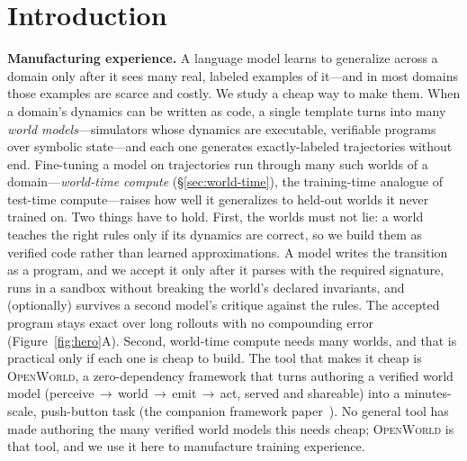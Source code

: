 \documentclass[11pt]{article}
\newcommand{\openworld}{\textsc{OpenWorld}}
\begin{document}
\section{Introduction}
\textbf{Manufacturing experience.} A language model learns to generalize across a domain only after
it sees many real, labeled examples of it---and in most domains those examples are scarce and
costly. We study a cheap way to make them. When a domain's dynamics can be written as
code, a single template turns into many \emph{world models}---simulators whose
dynamics are executable, verifiable programs over symbolic state---and each one
generates exactly-labeled trajectories without end. Fine-tuning a model on trajectories
run through many such worlds of a domain---\emph{world-time compute}
(\S\ref{sec:world-time}), the training-time analogue of test-time compute---raises how well it
generalizes to held-out worlds it never trained on. Two things have to hold.
First, the worlds must not lie: a world teaches
the right rules only if its dynamics are correct, so we build them as verified code
rather than learned approximations. A model writes the transition as a program, and we accept it only after it
parses with the required signature, runs in a sandbox without breaking the world's declared
invariants, and (optionally) survives a second model's critique against the rules. The accepted
program stays exact over long rollouts with no compounding error
(Figure~\ref{fig:hero}A). Second, world-time compute needs many worlds, and that is
practical only if each one is cheap to build. The tool that makes it cheap is \openworld{}, a
zero-dependency framework that turns authoring a verified world model
(perceive\,$\to$\,world\,$\to$\,emit\,$\to$\,act, served and shareable) into a minutes-scale,
push-button task (the companion framework paper~\cite{openworld_framework}). No general tool
has made authoring the many verified world models this needs cheap; \openworld{} is that
tool, and we use it here to manufacture training experience.
\end{document}
